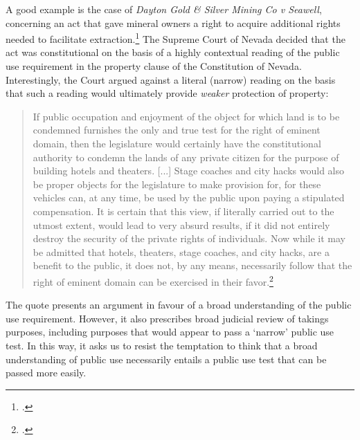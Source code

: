 {%

A good example is the case of {\it Dayton Gold \& Silver Mining Co v Seawell}, concerning an act that gave mineral owners a right to acquire additional rights needed to facilitate extraction.\footcite{seawell76} The Supreme Court of Nevada decided that the act was constitutional on the basis of a highly contextual reading of the public use requirement in the property clause of the Constitution of Nevada. Interestingly, the Court argued against a literal (narrow) reading on the basis that such a reading would ultimately provide {\it weaker} protection of property:

\begin{quote}
If public occupation and enjoyment of the object for which land is to be condemned furnishes the only and true test for the right of eminent domain, then the legislature would certainly have the constitutional authority to condemn the lands of any private citizen for the purpose of building hotels and theaters. [...] Stage coaches and city hacks would also be proper objects for the legislature to make provision for, for these vehicles can, at any time, be used by the public upon paying a stipulated compensation. It is certain that this view, if literally carried out to the utmost extent, would lead to very absurd results, if it did not entirely destroy the security of the private rights of individuals. Now while it may be admitted that hotels, theaters, stage coaches, and city hacks, are a benefit to the public, it does not, by any means, necessarily follow that the right of eminent domain can be exercised in their favor.\footcite[410-411]{seawell76}
\end{quote}

The quote presents an argument in favour of a broad understanding of the public use requirement. However, it also prescribes broad judicial review of takings purposes, including purposes that would appear to pass a `narrow' public use test. In this way, it asks us to  resist the temptation to think that a broad understanding of public use necessarily entails a public use test that can be passed more easily.

}
